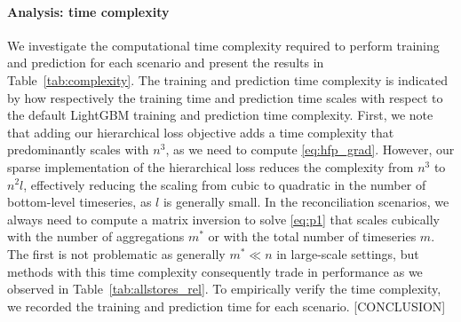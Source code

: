 \documentclass[preprint, 3p, times, twocolumn]{elsarticle}
\begin{document}
  \paragraph{Analysis: time complexity} We investigate the computational time complexity required to perform training and prediction for each scenario and present the results in Table~\ref{tab:complexity}. The training and prediction time complexity is indicated by how respectively the training time and prediction time scales with respect to the default LightGBM training and prediction time complexity. First, we note that adding our hierarchical loss objective adds a time complexity that predominantly scales with \(n^3\), as we need to compute \eqref{eq:hfp_grad}. However, our sparse implementation of the hierarchical loss reduces the complexity from \(n^3\) to \(n^2l\), effectively reducing the scaling from cubic to quadratic in the number of bottom-level timeseries, as \(l\) is generally small. In the reconciliation scenarios, we always need to compute a matrix inversion to solve \eqref{eq:p1} that scales cubically with the number of aggregations \(m^*\) or with the total number of timeseries \(m\). The first is not problematic as generally \(m^* \ll n\) in large-scale settings, but methods with this time complexity consequently trade in performance as we observed in Table~\ref{tab:allstores_rel}. To empirically verify the time complexity, we recorded the training and prediction time for each scenario. [CONCLUSION]
\end{document}
